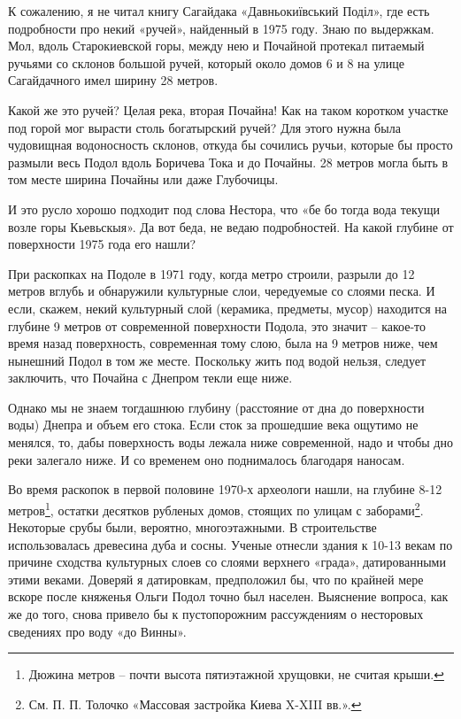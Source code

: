 К сожалению, я не читал книгу Сагайдака «Давньокиївський Поділ», где есть подробности про некий «ручей», найденный в 1975 году. Знаю по выдержкам. Мол, вдоль Старокиевской горы, между нею и Почайной протекал питаемый ручьями со склонов большой ручей, который около домов 6 и 8 на улице Сагайдачного имел ширину 28 метров. 

Какой же это ручей? Целая река, вторая Почайна! Как на таком коротком участке под горой мог вырасти столь богатырский ручей? Для этого нужна была чудовищная водоносность склонов, откуда бы сочились ручьи, которые бы просто размыли весь Подол вдоль Боричева Тока и до Почайны. 28 метров могла быть в том месте ширина Почайны или даже Глубочицы.

И это русло хорошо подходит под слова Нестора, что «бе бо тогда вода текущи возле горы Кьевьскыя». Да вот беда, не ведаю подробностей. На какой глубине от поверхности 1975 года его нашли?

При раскопках на Подоле в 1971 году, когда метро строили, разрыли до 12 метров вглубь и обнаружили культурные слои, чередуемые со слоями песка. И если, скажем, некий культурный слой (керамика, предметы, мусор) находится на глубине 9 метров от современной поверхности Подола, это значит – какое-то время назад поверхность, современная тому слою, была на 9 метров ниже, чем нынешний Подол в том же месте. Поскольку жить под водой нельзя, следует заключить, что Почайна с Днепром текли еще ниже.

Однако мы не знаем тогдашнюю глубину (расстояние от дна до поверхности воды) Днепра и объем его стока. Если сток за прошедшие века ощутимо не менялся, то, дабы поверхность воды лежала ниже современной, надо и чтобы дно реки залегало ниже. И со временем оно поднималось благодаря наносам.

Во время раскопок в первой половине 1970-х археологи нашли, на глубине 8-12 метров\footnote{Дюжина метров – почти высота пятиэтажной хрущовки, не считая крыши.}, остатки десятков рубленых домов, стоящих по улицам с заборами\footnote{См. П. П. Толочко «Массовая застройка Киева X-XIII вв.».}. Некоторые срубы были, вероятно, многоэтажными. В строительстве использовалась древесина дуба и сосны. Ученые отнесли здания к 10-13 векам по причине сходства культурных слоев со слоями верхнего «града», датированными этими веками. Доверяй я датировкам, предположил бы, что по крайней мере вскоре после княженья Ольги Подол точно был населен. Выяснение вопроса, как же до того, снова привело бы к пустопорожним рассуждениям о несторовых сведениях про воду «до Винны».

